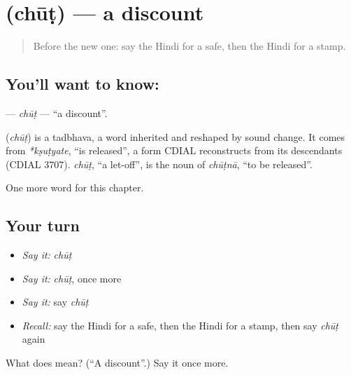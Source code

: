 \section[\texorpdfstring{\hi{छूट} (chūṭ)}{छूट (chūṭ)}]{ (chūṭ) — a discount}

\label{lesson:HI-C250-chut}



\begin{quote}
Before the new one: say the Hindi for a safe, then the Hindi for a stamp.
\end{quote}

\subsection*{You'll want to know: }
\textbf{} — \emph{chūṭ} — \textquotedblleft{}a discount\textquotedblright{}.

\begin{cousinweb}
\textbf{} (\emph{chūṭ}) is a tadbhava, a word inherited and reshaped by sound change. It comes from \emph{*kṣuṭyate}, \textquotedblleft{}is released\textquotedblright{}, a form CDIAL reconstructs from its descendants (CDIAL 3707). \emph{chūṭ}, \textquotedblleft{}a let-off\textquotedblright{}, is the noun of \emph{chūṭnā}, \textquotedblleft{}to be released\textquotedblright{}.
\end{cousinweb}

\begin{grammarlens}[title={What you've built}]
One more word for this chapter.
\end{grammarlens}

\subsection*{Your turn}
\begin{itemize}
\raggedright
  \item \emph{Say it:} \emph{chūṭ}
  \item \emph{Say it:} \emph{chūṭ}, once more
  \item \emph{Say it:} say \emph{chūṭ}
  \item \emph{Recall:} say the Hindi for a safe, then the Hindi for a stamp, then say \emph{chūṭ} again
\end{itemize}

\begin{tcolorbox}[breakable,colback=teal!4,colframe=teal!35!black,title={Before you move on}]
What does  mean? (\textquotedblleft{}A discount\textquotedblright{}.) Say it once more.
\end{tcolorbox}

